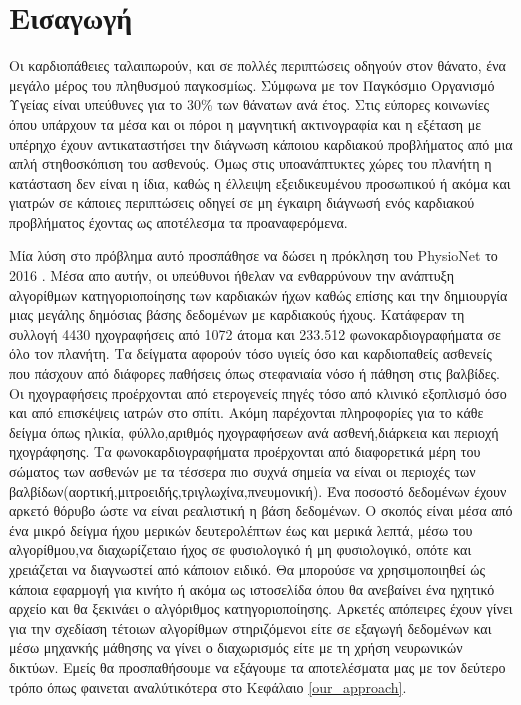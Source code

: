 \section{Εισαγωγή}
Οι καρδιοπάθειες ταλαιπωρούν, και σε πολλές περιπτώσεις οδηγούν στον θάνατο, ένα
μεγάλο μέρος του πληθυσμού παγκοσμίως. Σύμφωνα με τον Παγκόσμιο Οργανισμό Υγείας\cite{who}
είναι υπεύθυνες για το 30\% των θάνατων ανά έτος. Στις εύπορες κοινωνίες όπου
υπάρχουν τα μέσα και οι πόροι η μαγνητική ακτινογραφία και η εξέταση με υπέρηχο
έχουν αντικαταστήσει την διάγνωση κάποιου καρδιακού προβλήματος από μια απλή
στηθοσκόπιση του ασθενούς. Όμως στις υποανάπτυκτες χώρες του πλανήτη η κατάσταση
δεν είναι η ίδια, καθώς η έλλειψη εξειδικευμένου προσωπικού ή ακόμα και γιατρών
σε κάποιες περιπτώσεις οδηγεί σε μη έγκαιρη διάγνωσή ενός καρδιακού προβλήματος
έχοντας ως αποτέλεσμα τα προαναφερόμενα.

Μία λύση στο πρόβλημα αυτό προσπάθησε να δώσει η πρόκληση του PhysioNet το 2016
\cite{clifford2016classification}. Μέσα απο αυτήν, οι υπεύθυνοι ήθελαν να
ενθαρρύνουν την ανάπτυξη αλγορίθμων κατηγοριοποίησης των καρδιακών ήχων καθώς
επίσης και την δημιουργία μιας μεγάλης δημόσιας βάσης δεδομένων με καρδιακούς
ήχους. Κατάφεραν τη συλλογή 4430 ηχογραφήσεις από 1072 άτομα και 233.512
φωνοκαρδιογραφήματα σε όλο τον πλανήτη.  Τα δείγματα αφορούν τόσο υγιείς όσο και
καρδιοπαθείς ασθενείς που πάσχουν από διάφορες παθήσεις όπως στεφανιαία νόσο ή
πάθηση στις βαλβίδες. Οι ηχογραφήσεις προέρχονται από ετερογενείς πηγές τόσο από
κλινικό εξοπλισμό όσο και από επισκέψεις ιατρών στο σπίτι. Ακόμη παρέχονται
πληροφορίες για το κάθε δείγμα όπως ηλικία, φύλλο,αριθμός ηχογραφήσεων ανά
ασθενή,διάρκεια και περιοχή ηχογράφησης. Τα φωνοκαρδιογραφήματα προέρχονται από
διαφορετικά μέρη του σώματος των ασθενών με τα τέσσερα πιο συχνά σημεία να είναι
οι περιοχές των βαλβίδων(αορτική,μιτροειδής,τριγλωχίνα,πνευμονική). Ένα ποσοστό
δεδομένων έχουν αρκετό θόρυβο ώστε να είναι ρεαλιστική η βάση δεδομένων.  Ο
σκοπός είναι μέσα από ένα μικρό δείγμα ήχου μερικών δευτερολέπτων έως και μερικά
λεπτά, μέσω του αλγορίθμου,να διαχωρίζεταιο ήχος σε φυσιολογικό ή μη
φυσιολογικό, οπότε και χρειάζεται να διαγνωστεί από κάποιον ειδικό. Θα μπορούσε
να χρησιμοποιηθεί ώς κάποια εφαρμογή για κινήτο ή ακόμα ως ιστοσελίδα όπου θα
ανεβαίνει ένα ηχητικό αρχείο και θα ξεκινάει ο αλγόριθμος κατηγοριοποίησης.
Αρκετές απόπειρες έχουν γίνει για την σχεδίαση τέτοιων αλγορίθμων στηριζόμενοι
είτε σε εξαγωγή δεδομένων και μέσω μηχανκής μάθησης να γίνει ο διαχωρισμός είτε
με τη χρήση νευρωνικών δικτύων. Εμείς θα προσπαθήσουμε να εξάγουμε τα
αποτελέσματα μας με τον δεύτερο τρόπο όπως φαινεται αναλύτικότερα στο Κεφάλαιο
\ref{our_approach}.

